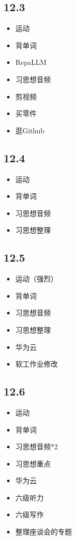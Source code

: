 \documentclass[UTF8]{ctexart}
\begin{document}
\subsection*{12.3}
\begin{itemize}
    \item 运动
    \item 背单词
    \item RepaLLM
    \item 习思想音频
    \item 剪视频
    \item 买零件
    \item 逛Github
\end{itemize}

\subsection*{12.4}
\begin{itemize}
    \item 运动
    \item 背单词
    \item 习思想音频
    \item 习思想整理
\end{itemize}

\subsection*{12.5}
\begin{itemize}
    \item 运动（强烈）
    \item 背单词
    \item 习思想音频
    \item 习思想整理
    \item 华为云
    \item 软工作业修改
\end{itemize}

\subsection*{12.6}
\begin{itemize}
    \item 运动
    \item 背单词
    \item 习思想音频*2
    \item 习思想重点
    \item 华为云
    \item 六级听力
    \item 六级写作
    \item 整理座谈会的专题
\end{itemize}
\end{document}
